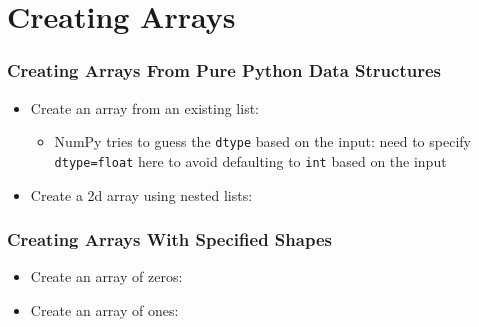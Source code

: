 \documentclass[xcolor={x11names,table}]{beamer}
\begin{document}
\section{Creating Arrays}

\begin{frame}
	\frametitle{Creating Arrays From Pure Python Data Structures}
	\begin{itemize}
		\item Create an array from an existing list:
		
		\begin{itemize}
			\item NumPy tries to guess the \texttt{dtype} based on the input: need to specify \texttt{dtype=float} here to avoid defaulting to \texttt{int} based on the input
		\end{itemize}
		\item Create a 2d array using nested lists:
		
	\end{itemize}
\end{frame}

\begin{frame}
	\frametitle{Creating Arrays With Specified Shapes}
	\begin{itemize}
		\item Create an array of zeros:
		
		\item Create an array of ones:
		
	\end{itemize}
\end{frame}

%		
%		
\end{document}
